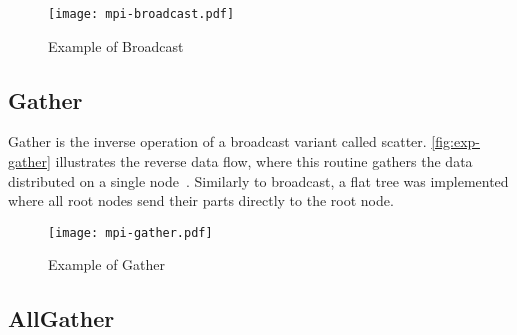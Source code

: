 			\begin{figure}[!tb]
				\centering%
				\caption{Example of \mpi Broadcast}%
				\label{fig:exp-broadcast}%
				\texttt{[image: mpi-broadcast.pdf]}%
			\end{figure}




		\subsection{Gather}

			Gather is the inverse operation of a broadcast variant called scatter.
			\autoref{fig:exp-gather} illustrates the reverse data flow, where this
			routine gathers the data distributed on a single node~\cite{url:mpitutorial}.
			Similarly to broadcast, a flat tree was implemented where all root
			nodes send their parts directly to the root node.

			\begin{figure}[!tb]
				\centering%
				\caption{Example of \mpi Gather}%
				\label{fig:exp-gather}%
				\texttt{[image: mpi-gather.pdf]}%
			\end{figure}

		\subsection{AllGather}

